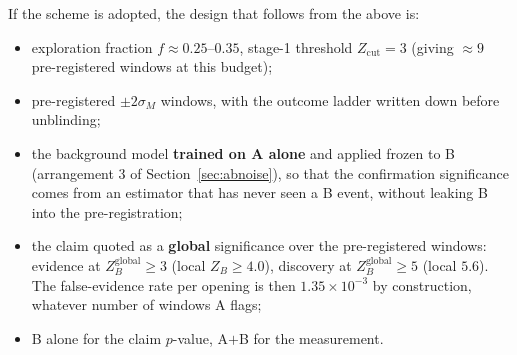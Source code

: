 If the scheme is adopted, the design that follows from the above is:

\begin{itemize}[leftmargin=1.4em,itemsep=2pt]
  \item exploration fraction $f \approx 0.25$--$0.35$, stage-1 threshold $Z_{\mathrm{cut}} = 3$
        (giving $\approx 9$ pre-registered windows at this budget);
  \item pre-registered $\pm2\sigma_M$ windows, with the outcome ladder written down before
        unblinding;
  \item the background model \textbf{trained on A alone} and applied frozen to B
        (arrangement 3 of Section~\ref{sec:abnoise}), so that the confirmation significance comes
        from an estimator that has never seen a B event, without leaking B into the
        pre-registration;
  \item the claim quoted as a \textbf{global} significance over the pre-registered windows:
        evidence at $Z_B^{\mathrm{global}} \ge 3$ (local $Z_B \ge 4.0$), discovery at
        $Z_B^{\mathrm{global}} \ge 5$ (local $5.6$). The false-evidence rate per opening is then
        $1.35\times10^{-3}$ by construction, whatever number of windows A flags;
  \item B alone for the claim $p$-value, A$+$B for the measurement.
\end{itemize}
